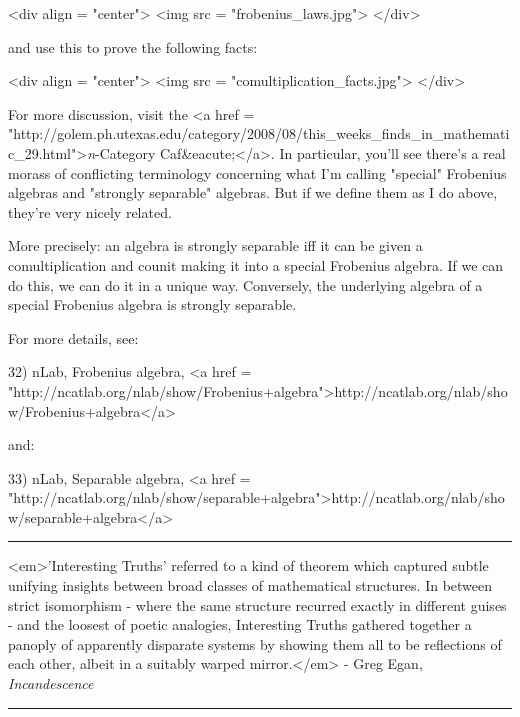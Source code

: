 <div align = "center">
<img src = "frobenius_laws.jpg">
</div>

and use this to prove the following facts:

<div align = "center">
<img src = "comultiplication_facts.jpg">
</div>

For more discussion, visit the 
<a href = "http://golem.ph.utexas.edu/category/2008/08/this_weeks_finds_in_mathematic_29.html">\emph{n}-Category 
Caf&eacute;</a>.  In particular, you'll see there's a real
morass of conflicting terminology concerning what I'm calling
"special" Frobenius algebras and "strongly 
separable" algebras.  But if we define them as I do above,
they're very nicely related.

More precisely: an algebra is strongly separable iff it can be given a
comultiplication and counit making it into a special Frobenius
algebra.  If we can do this, we can do it in a unique way.
Conversely, the underlying algebra of a special Frobenius algebra is
strongly separable.

For more details, see:

32) nLab, Frobenius algebra,
<a href = "http://ncatlab.org/nlab/show/Frobenius+algebra">http://ncatlab.org/nlab/show/Frobenius+algebra</a>

and: 

33) nLab, Separable algebra, <a href = "http://ncatlab.org/nlab/show/separable+algebra">http://ncatlab.org/nlab/show/separable+algebra</a>

\par\noindent\rule{\textwidth}{0.4pt}
 
<em>'Interesting Truths' referred to a kind of theorem which
captured subtle unifying insights between broad classes of
mathematical structures. In between strict isomorphism - where the
same structure recurred exactly in different guises - and the loosest
of poetic analogies, Interesting Truths gathered together a panoply of
apparently disparate systems by showing them all to be reflections of
each other, albeit in a suitably warped mirror.</em> - Greg Egan,
\emph{Incandescence}

\par\noindent\rule{\textwidth}{0.4pt}

